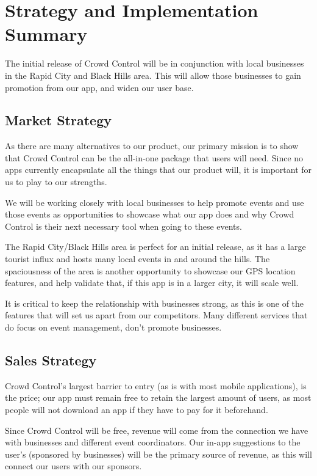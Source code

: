 

\chapter{Strategy and Implementation Summary}

The initial release of Crowd Control will be in conjunction with local businesses in the Rapid City and Black Hills area. This will allow those businesses to gain promotion from our app, and widen our user base.

\section{Market Strategy}
As there are many alternatives to our product, our primary mission is to show that Crowd Control can be the all-in-one package that users will need. Since no apps currently encapsulate all the things that our product will, it is important for us to play to our strengths.

We will be working closely with local businesses to help promote events and use those events as opportunities to showcase what our app does and why Crowd Control is their next necessary tool when going to these events.

The Rapid City/Black Hills area is perfect for an initial release, as it has a large tourist influx and hosts many local events in and around the hills. The spaciousness of the area is another opportunity to showcase our GPS location features, and help validate that, if this app is in a larger city, it will scale well.

It is critical to keep the relationship with businesses strong, as this is one of the features that will set us apart from our competitors. Many different services that do focus on event management, don’t promote businesses.

\section{Sales Strategy}

Crowd Control’s largest barrier to entry (as is with most mobile applications), is the price; our app must remain free to retain the largest amount of users, as most people will not download an app if they have to pay for it beforehand.

Since Crowd Control will be free, revenue will come from the connection we have with businesses and different event coordinators. Our in-app suggestions to the user's (sponsored by businesses) will be the primary source of revenue, as this will connect our users with our sponsors.


